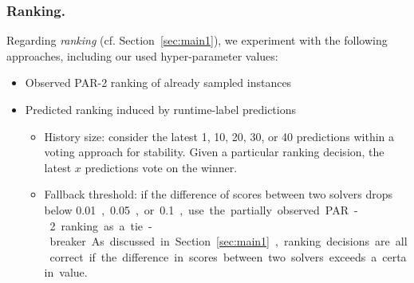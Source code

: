 \documentclass[runningheads]{llncs}
\begin{document}
\subsubsection{Ranking.}
Regarding \emph{ranking} (cf. Section~\ref{sec:main1}), we experiment with the following approaches, including our used hyper-parameter values:
\begin{itemize}
  \item Observed PAR-2 ranking of already sampled instances
  \item Predicted ranking induced by runtime-label predictions
  \begin{itemize}
    \item History size: consider the latest 1, 10, 20, 30, or 40 predictions within a voting approach for stability. Given a particular ranking decision, the latest $x$ predictions vote on the winner.
    \item Fallback threshold: if the difference of scores between two solvers drops below \SI{0.01}, \SI{0.05}, or \SI{0.1}, use the partially observed PAR-2 ranking as a tie-breaker. As discussed in Section~\ref{sec:main1}, ranking decisions are all correct if the difference in scores between two solvers exceeds a certain value.
  \end{itemize}
\end{itemize}
\end{document}
